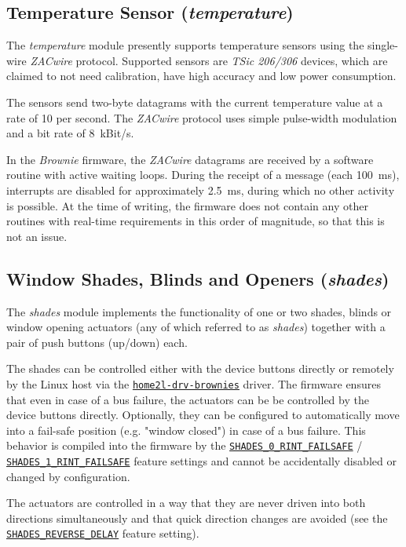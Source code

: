 \documentclass[12pt,english,parskip=half,headheight=19pt]{scrreprt}
\newcommand{\idx}[1]{#1\index{#1}}
\newcommand{\reftool}[1]{\hyperref[tool:#1]{\texttt{\idx{#1}}}}
\newcommand{\refapic}[1]{\href{home2l-api_c/index.html}{\mbox{\texttt{#1}}}}            %
\begin{document}
\subsection{Temperature Sensor (\textit{temperature})}
\label{sec:brownies-features-temp}

The \textit{temperature} module presently supports temperature sensors using the single-wire \textit{ZACwire} protocol. Supported sensors are \textit{TSic 206/306} devices, which are claimed to not need calibration, have high accuracy and low power consumption.

The sensors send two-byte datagrams with the current temperature value at a rate of 10 per second.
The \textit{ZACwire} protocol uses simple pulse-width modulation and a bit rate of 8~kBit/s.

In the \textit{Brownie} firmware, the \textit{ZACwire} datagrams are received by a software routine with active waiting loops. During the receipt of a message (each 100~ms), interrupts are disabled for approximately 2.5~ms, during which no other activity is possible. At the time of writing, the firmware does not contain any other routines with real-time requirements in this order of magnitude, so that this is not an issue.



\subsection{Window Shades, Blinds and Openers (\textit{shades})}
\label{sec:brownies-features-shades}

The \textit{shades} module implements the functionality of one or two shades, blinds or window opening actuators (any of which referred to as \textit{shades}) together with a pair of push buttons (up/down) each.

The shades can be controlled either with the device buttons directly or remotely by the Linux host via the \reftool{home2l-drv-brownies} driver. The firmware ensures that even in case of a bus failure, the actuators can be be controlled by the device buttons directly. Optionally, they can be configured to automatically move into a fail-safe position (e.g. "window closed") in case of a bus failure. This behavior is compiled into the firmware by the \refapic{SHADES\_0\_RINT\_FAILSAFE} / \refapic{SHADES\_1\_RINT\_FAILSAFE} feature settings and cannot be accidentally disabled or changed by configuration.

The actuators are controlled in a way that they are never driven into both directions simultaneously and that quick direction changes are avoided (see the \refapic{SHADES\_REVERSE\_DELAY} feature setting).
\end{document}
